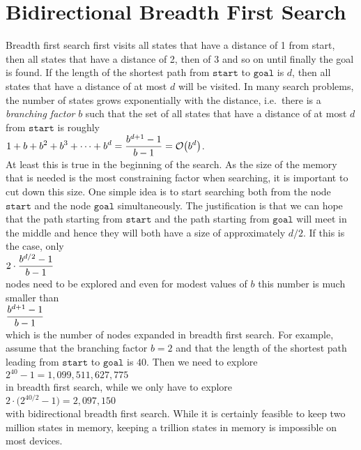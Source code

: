 \section{Bidirectional Breadth First Search}
Breadth first search first visits all states that have a distance of 1 from start, then all
states that have a distance of 2, then of 3 and so on until finally the goal is found.  If the length of the shortest path
from $\mathtt{start}$ to $\mathtt{goal}$ is $d$, then all states that have a distance of at most $d$ will be
visited.  In many search problems, the number of states grows exponentially with the distance, i.e.~there is
a \emph{\color{blue}branching factor} $b$ such that the set of all states that have a distance of at most $d$
from $\mathtt{start}$ is roughly
\\[0.2cm]
\hspace*{1.3cm}
 $\displaystyle 1 + b + b^2 + b^3 + \cdots + b^d = \frac{b^{d+1} - 1}{b - 1} = \mathcal{O}\bigl(b^d\bigr)$. 
\\[0.2cm]
At least this is true in the beginning of the search.  As the size of
the memory that is needed is the most constraining factor when searching, it is important to cut down this
size.  One simple idea is to start searching both from the node $\mathtt{start}$ and the node $\mathtt{goal}$
simultaneously.  The justification is that we can hope that the path starting from $\mathtt{start}$ and the
path starting from $\mathtt{goal}$ will meet in the middle and hence they will both have a size of approximately
$d/2$.  If this is the case, only
\\[0.2cm]
\hspace*{1.3cm}
$\displaystyle 2 \cdot \frac{b^{d/2} - 1}{b - 1}$ 
\\[0.2cm]
nodes need to be explored and even for modest values of $b$ this number is much smaller than 
\\[0.2cm]
\hspace*{1.3cm}
$\displaystyle\frac{b^{d+1} - 1}{b - 1}$
\\[0.2cm]
which is the number of nodes expanded in breadth first search.  For example, assume that the branching factor
$b = 2$ and that the length of the shortest path leading from $\mathtt{start}$ to $\mathtt{goal}$
is $40$.  Then we need to explore
\\[0.2cm]
\hspace*{1.3cm}
$2^{40} - 1 = 1,099,511,627,775$
\\[0.2cm]
in breadth first search, while we only have to explore 
\\[0.2cm]
\hspace*{1.3cm}
$2 \cdot \bigl(2^{40/2} - 1\bigr) = 2,097,150$
\\[0.2cm]
with bidirectional breadth first search.  While it is certainly feasible to keep two million states in memory,
keeping a trillion states in memory is impossible on most devices.


